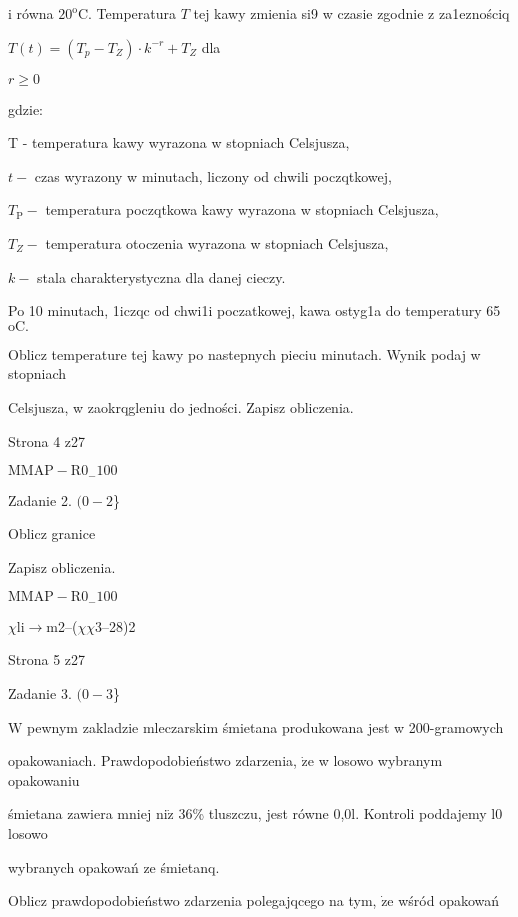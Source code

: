 \documentclass[a4paper,12pt]{article}
\begin{document}
i równa $20^{\mathrm{o}}\mathrm{C}$. Temperatura $T$ tej kawy zmienia si9 w czasie zgodnie z za1eznościq

$T(t)=(T_{p}-T_{Z})\cdot k^{-r}+T_{Z}$ dla

$r\geq 0$

gdzie:

T - temperatura kawy wyrazona w stopniach Celsjusza,

$t -$ czas wyrazony w minutach, liczony od chwili poczqtkowej,

$T_{\mathrm{P}}-$ temperatura poczqtkowa kawy wyrazona w stopniach Celsjusza,

$T_{Z}-$ temperatura otoczenia wyrazona w stopniach Celsjusza,

$k -$ stala charakterystyczna dla danej cieczy.

Po 10 minutach, 1iczqc od chwi1i poczatkowej, kawa ostyg1a do temperatury 65 $\mathrm{o}\mathrm{C}.$

Oblicz temperature tej kawy po nastepnych pieciu minutach. Wynik podaj w stopniach

Celsjusza, w zaokrqgleniu do jedności. Zapisz obliczenia.

Strona 4 z27

$\mathrm{M}\mathrm{M}\mathrm{A}\mathrm{P}-\mathrm{R}0_{-}100$





Zadanie 2. $(0-2$\}

Oblicz granice

Zapisz obliczenia.

$\mathrm{M}\mathrm{M}\mathrm{A}\mathrm{P}-\mathrm{R}0_{-}100$

$\chi$li$\rightarrow$m2--($\chi\chi$3--28)2

Strona 5 z27





Zadanie 3. $(0-3$\}

$\mathrm{W}$ pewnym zakladzie mleczarskim śmietana produkowana jest w 200-gramowych

opakowaniach. Prawdopodobieństwo zdarzenia, $\dot{\mathrm{z}}\mathrm{e}$ w losowo wybranym opakowaniu

śmietana zawiera mniej $\mathrm{n}\mathrm{i}\dot{\mathrm{z}}$ 36\% tluszczu, jest równe 0,0l. Kontroli poddajemy l0 losowo

wybranych opakowań ze śmietanq.

Oblicz prawdopodobieństwo zdarzenia polegajqcego na tym, $\dot{\mathrm{z}}\mathrm{e}$ wśród opakowań
\end{document}
